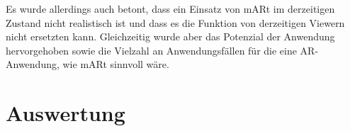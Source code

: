 Es wurde allerdings auch betont, dass ein Einsatz von mARt im derzeitigen Zustand nicht realistisch ist und dass es die Funktion von derzeitigen Viewern nicht ersetzten kann. Gleichzeitig wurde aber das Potenzial der Anwendung hervorgehoben sowie die Vielzahl an Anwendungsfällen für die eine AR-Anwendung, wie mARt sinnvoll wäre. 

\section{Auswertung}
